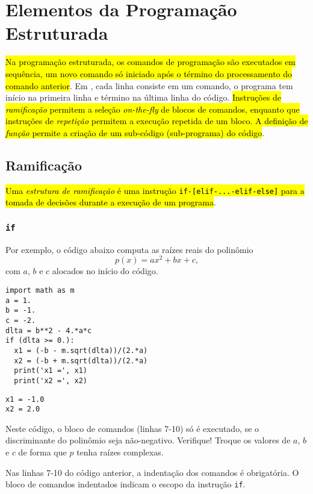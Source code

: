 \section{Elementos da Programação Estruturada}\label{sec_progest}

\hl{Na programação estruturada, os comandos de programação são executados em sequência, um novo comando só iniciado após o término do processamento do comando anterior}. Em {\python}, cada linha consiste em um comando, o programa tem início na primeira linha e término na última linha do código. \hl{Instruções de \emph{ramificação} permitem a seleção \textit{on-the-fly} de blocos de comandos, enquanto que instruções de \emph{repetição} permitem a execução repetida de um bloco. A definição de \emph{função} permite a criação de um sub-código (sub-programa) do código}.

\subsection{Ramificação}

\hl{Uma \emph{estrutura de ramificação} é uma instrução \texttt{if-[elif-...-elif-else]} para a tomada de decisões durante a execução de um programa}.

\subsubsection{\texttt{if}}

Por exemplo, o código abaixo computa as raízes reais do polinômio
\begin{equation}
  p(x) = ax^2 + bx + c,
\end{equation}  
com $a$, $b$ e $c$ alocados no início do código.

\begin{lstlisting}
import math as m
a = 1.
b = -1.
c = -2.
dlta = b**2 - 4.*a*c
if (dlta >= 0.):
  x1 = (-b - m.sqrt(dlta))/(2.*a)
  x2 = (-b + m.sqrt(dlta))/(2.*a)
  print('x1 =', x1)
  print('x2 =', x2)
\end{lstlisting}

\begin{verbatim}
x1 = -1.0
x2 = 2.0
\end{verbatim}

Neste código, o bloco de comandos (linhas 7-10) só é executado, se o discriminante do polinômio seja não-negativo. Verifique! Troque os valores de $a$, $b$ e $c$ de forma que $p$ tenha raízes complexas.

\begin{obs}
  Nas linhas 7-10 do código anterior, a indentação dos comandos é obrigatória. O bloco de comandos indentados indicam o escopo da instrução \texttt{if}.
\end{obs}

